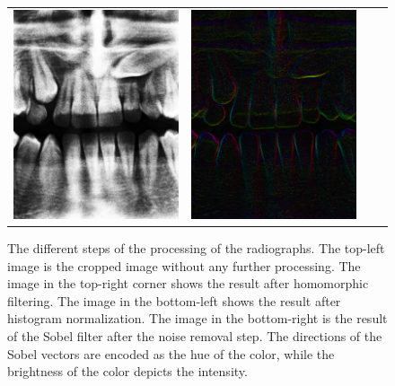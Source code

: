 \documentclass[a4paper,10pt]{article}
\begin{document}
\begin{figure}[!h]
\begin{tabular}{cccc}
 \includegraphics[width=80mm]{norm.png} & \includegraphics[width=80mm]{gradients.png} \\
 
\end{tabular}
 \caption{The different steps of the processing of the radiographs. The top-left image is the cropped image without any further processing. The image in the top-right corner shows the result after homomorphic filtering. The image in the bottom-left shows the result after histogram normalization. The image in the bottom-right is the result of the Sobel filter after the noise removal step. The directions of the Sobel vectors are encoded as the hue of the color, while the brightness of the color depicts the intensity. }
\end{figure}
\end{document}
